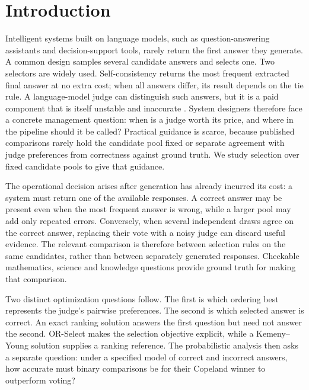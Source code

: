 \documentclass[preprint,11pt,number,sort&compress]{elsarticle}
\begin{document}
\section{Introduction}

Intelligent systems built on language models, such as question-answering
assistants and decision-support tools, rarely return the first answer they
generate. A common design samples several candidate answers and selects one.
Two selectors are widely used. Self-consistency \citep{wang2023selfconsistency}
returns the most frequent extracted final answer at no extra cost; when all
answers differ, its result depends on the tie rule. A language-model judge can
distinguish such answers, but it is a paid component that is itself unstable
and inaccurate \citep{atil2024nondeterminism,landesberg2026bestofn}.
System designers therefore face a concrete management question: when is a
judge worth its price, and where in the pipeline should it be called? Practical
guidance is scarce, because published comparisons rarely hold the candidate
pool fixed or separate agreement with judge preferences from correctness
against ground truth. We study selection over fixed candidate pools to give
that guidance.

The operational decision arises after generation has already incurred its
cost: a system must return one of the available responses. A correct answer
may be present even when the most frequent answer is wrong, while a larger
pool may add only repeated errors. Conversely, when several independent
draws agree on the correct answer, replacing their vote with a noisy judge
can discard useful evidence. The relevant comparison is therefore between
selection rules on the same candidates, rather than between separately
generated responses. Checkable mathematics, science and knowledge questions
provide ground truth for making that comparison.

Two distinct optimization questions follow. The first is which ordering
best represents the judge's pairwise preferences. The second is which
selected answer is correct. An exact ranking solution answers the first
question but need not answer the second. OR-Select makes the selection
objective explicit, while a Kemeny--Young solution supplies a ranking
reference. The probabilistic analysis then asks a separate question: under
a specified model of correct and incorrect answers, how accurate must
binary comparisons be for their Copeland winner to outperform voting?
\end{document}
